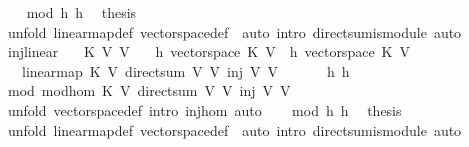 \begin{isabellebody}
\ \ \isamarkupfalse%
\ mod\ h{}\ h{}\ \isamarkupfalse%
\ {\isacharquery}thesis\ \isanewline
\ \ \ \ \isamarkupfalse%
\ {\isacharparenleft}unfold\ linear{\isacharunderscore}map{\isacharunderscore}def\ vectorspace{\isacharunderscore}def\ {\isacharcomma}\ auto{\isacharcomma}\ intro\ direct{\isacharunderscore}sum{\isacharunderscore}is{\isacharunderscore}module{\isacharcomma}\ auto{\isacharparenright}\isanewline
{}\isamarkupfalse%
%
\endisatagproof
{\isafoldproof}%
%
\isadelimproof
\isanewline
%
\endisadelimproof
\isanewline
{}\isamarkupfalse%
\ inj{}{\isacharunderscore}linear{\isacharcolon}\isanewline
\ \ \ K\ V{}\ V{}\isanewline
\ \ \ h{}{\isacharcolon}\ {\isachardoublequoteopen}vectorspace\ K\ V{}{\isachardoublequoteclose}\ \ h{}{\isacharcolon}\ {\isachardoublequoteopen}vectorspace\ K\ V{}{\isachardoublequoteclose}\isanewline
\ \ \ {\isachardoublequoteopen}linear{\isacharunderscore}map\ K\ V{}\ {\isacharparenleft}direct{\isacharunderscore}sum\ V{}\ V{}{\isacharparenright}\ {\isacharparenleft}inj{}\ V{}\ V{}{\isacharparenright}{\isachardoublequoteclose}\isanewline
%
\isadelimproof
%
\endisadelimproof
%
\isatagproof
{}\isamarkupfalse%
\ {\isacharminus}\ \isanewline
\ \ \isamarkupfalse%
\ h{}\ h{}\ \isamarkupfalse%
\ mod{\isacharcolon}\ {\isachardoublequoteopen}mod{\isacharunderscore}hom\ K\ V{}\ {\isacharparenleft}direct{\isacharunderscore}sum\ V{}\ V{}{\isacharparenright}\ {\isacharparenleft}inj{}\ V{}\ V{}{\isacharparenright}{\isachardoublequoteclose}\ \isamarkupfalse%
\ {\isacharparenleft}unfold\ vectorspace{\isacharunderscore}def{\isacharcomma}\ intro\ inj{}{\isacharunderscore}hom{\isacharcomma}\ auto{\isacharparenright}\isanewline
\ \ \isamarkupfalse%
\ mod\ h{}\ h{}\ \isamarkupfalse%
\ {\isacharquery}thesis\ \isanewline
\ \ \ \ \isamarkupfalse%
\ {\isacharparenleft}unfold\ linear{\isacharunderscore}map{\isacharunderscore}def\ vectorspace{\isacharunderscore}def\ {\isacharcomma}\ auto{\isacharcomma}\ intro\ direct{\isacharunderscore}sum{\isacharunderscore}is{\isacharunderscore}module{\isacharcomma}\ auto{\isacharparenright}\isanewline

\end{isabellebody}
